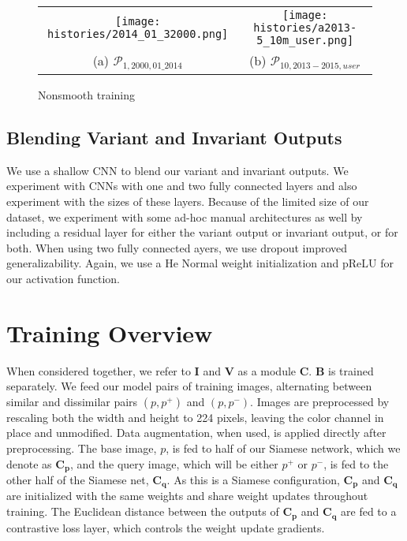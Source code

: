 \begin{figure}[!htbp]
	\centering
	\begin{tabular}{cc}
		\texttt{[image: histories/2014\_01\_32000.png]}  &       \texttt{[image: histories/a2013-5\_10m\_user.png]}  \\
		(a) $\mathcal{P}_{1,2000,01\_2014}$ & (b) $\mathcal{P}_{10,2013-2015,user}$\\[6pt]
	\end{tabular}
	\caption{Nonsmooth training}
	\label{fig:nonsmooth_training}
\end{figure}



\subsection{Blending Variant and Invariant Outputs}
We use a shallow CNN to blend our variant and invariant outputs. We experiment with CNNs with one and two fully connected layers and also experiment with the sizes of these layers. Because of the limited size of our dataset, we experiment with some ad-hoc manual architectures as well by including a residual layer for either the variant output or invariant output, or for both. When using two fully connected ayers, we use dropout improved generalizability. Again, we use a He Normal weight initialization and pReLU for our activation function.



\section{Training Overview}
When considered together, we refer to $\mathbf{I}$ and $\mathbf{V}$ as a module $\mathbf{C}$. $\mathbf{B}$ is trained separately. We feed our model pairs of training images, alternating between similar and dissimilar pairs $(p, p^+)$ and $(p, p^-)$. Images are preprocessed by rescaling both the width and height to 224 pixels, leaving the color channel in place and unmodified. Data augmentation, when used, is applied directly after preprocessing. The base image, $p$, is fed to half of our Siamese network, which we denote as $\mathbf{C_p}$, and the query image, which will be either $p^+$ or $p^-$, is fed to the other half of the Siamese net, $\mathbf{C_q}$. As this is a Siamese configuration, $\mathbf{C_p}$ and $\mathbf{C_q}$ are initialized with the same weights and share weight updates throughout training. The Euclidean distance between the outputs of $\mathbf{C_p}$ and $\mathbf{C_q}$ are fed to a contrastive loss layer, which controls the weight update gradients. 

